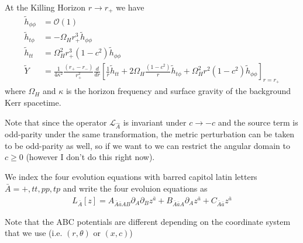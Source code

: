 \documentclass[aps,prd,amsmath,showpacs,amssymb,superscriptaddress,nofootinbib,longbibliography,eqsecnum,preprintnumbers]{revtex4-1}
\begin{document}
At the Killing Horizon $r\to r_+$ we have
\begin{align}
\tilde h_{\phi\phi} &=\mathcal{O}(1) \nonumber \\
\tilde h_{t\phi} &=-\Omega_H r_+^3\tilde h_{\phi\phi} \nonumber \\
\tilde h_{tt} &=\Omega_H^2r_+^3(1-c^2)\tilde h_{\phi\phi} \nonumber \\
\tilde Y &=\frac{1}{4\kappa^2}\frac{(r_+-r_-)}{r_+^2}\frac{d}{dr}\left[\frac{1}{r}\tilde h_{tt}+2\Omega_H\frac{(1-c^2)}{r}\tilde h_{t\phi}+\Omega_H^2r^2(1-c^2)\tilde h_{\phi\phi}\right]_{r=r_+}
\end{align}
where $\Omega_H$ and $\kappa$ is the horizon frequency and surface gravity of the background Kerr spacetime.

Note that since the operator
$\mathcal L_{\hat A}$ is invariant under $c\to -c$ and the source term is odd-parity under the same transformation, the metric perturbation can be taken to be odd-parity as well, so if we want to we can restrict the angular domain to $c\geq0$ (however I don't do this right now).

We index the four evolution equations with barred capitol latin letters$\bar A={+,tt,pp,tp}$ and write the four evoluion equations as
\begin{align}
L_{\bar A}[z]=A_{\bar A \bar a AB}\partial_{A}\partial_{B}z^{\bar a}+B_{\bar A \bar a A}\partial_{A}z^{\bar a}
+C_{\bar A \bar a }z^{\bar a}
\end{align}

Note that the ABC potentials are different depending on the coordinate system that we use (i.e. $(r,\theta)$ or $(x,c)$)
\end{document}
